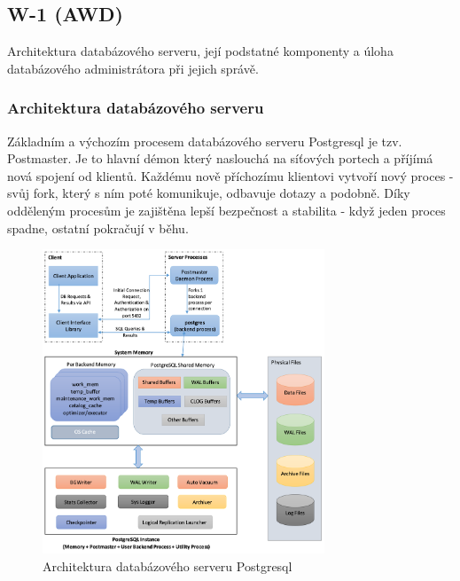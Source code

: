 \subsection{W-1 (AWD)}
Architektura databázového serveru, její podstatné komponenty a úloha databázového administrátora při jejich správě.

\subsubsection*{Architektura databázového serveru}
Základním a výchozím procesem databázového serveru Postgresql je tzv. Postmaster. Je to hlavní démon který naslouchá na síťových portech a příjímá nová spojení od klientů. Každému nově příchozímu klientovi vytvoří nový proces - svůj fork, který s ním poté komunikuje, odbavuje dotazy a podobně. Díky odděleným procesům je zajištěna lepší bezpečnost a stabilita - když jeden proces spadne, ostatní pokračují v běhu. 

\begin{figure}[H]
    \centering
    \includegraphics[width=0.75\textwidth]{img/postgresql_architecture.png}
    \caption{Architektura databázového serveru Postgresql}
\end{figure}

